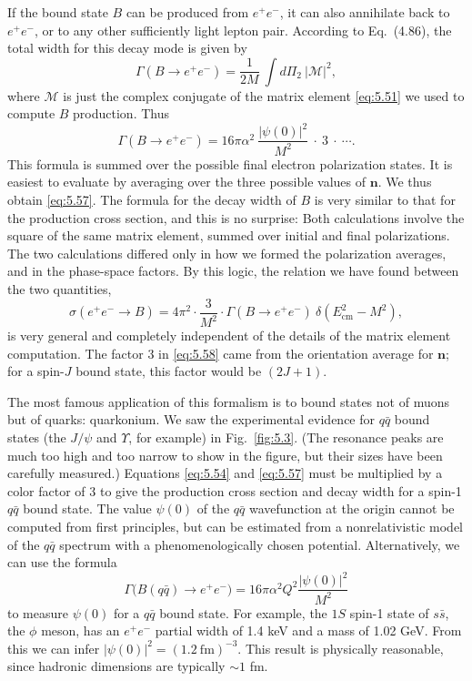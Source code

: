 If the bound state $B$ can be produced from $e^{+}e^{-}$, it can also annihilate
back to $e^{+}e^{-}$, or to any other sufficiently light lepton pair.
According to Eq.~(4.86), the total width for this decay mode is given by
\begin{equation}
  \Gamma(B \to e^{+}e^{-}) = \frac{1}{2M}\ \int d\Pi_2\ |\mathcal{M}|^2 ,
  \label{eq:5.55}
\end{equation}
where $\mathcal{M}$ is just the complex conjugate of the matrix element
\eqref{eq:5.51} we used to compute $B$ production.  Thus
\begin{equation}
  \Gamma(B \to e^{+}e^{-}) = 16\pi\alpha^2\ \frac{|\psi(0)|^2}{M^2}\
    \cdot\ 3\ \cdot\ \cdots .
  \label{eq:5.57}
\end{equation}
This formula is summed over the possible final electron polarization states.
It is easiest to evaluate by averaging over the three possible values of
$\mathbf{n}$.  We thus obtain \eqref{eq:5.57}.  The formula for the decay
width of $B$ is very similar to that for the production cross section, and
this is no surprise: Both calculations involve the square of the same matrix
element, summed over initial and final polarizations.  The two calculations
differed only in how we formed the polarization averages, and in the
phase-space factors.  By this logic, the relation we have found between the
two quantities,
\begin{equation}
  \sigma(e^{+}e^{-}\to B) = 4\pi^2\cdot\frac{3}{M^2}\cdot
    \Gamma(B\to e^{+}e^{-})\ \delta(E^2_{\mathrm{cm}} - M^2),
  \label{eq:5.58}
\end{equation}
is very general and completely independent of the details of the matrix
element computation.  The factor 3 in \eqref{eq:5.58} came from the
orientation average for $\mathbf{n}$; for a spin-$J$ bound state, this factor
would be $(2J+1)$.

The most famous application of this formalism is to bound states not of muons
but of quarks: quarkonium.  We saw the experimental evidence for $q\bar{q}$
bound states (the $J/\psi$ and $\Upsilon$, for example) in Fig.~\ref{fig:5.3}.
(The resonance peaks are much too high and too narrow to show in the figure,
but their sizes have been carefully measured.)  Equations \eqref{eq:5.54} and
\eqref{eq:5.57} must be multiplied by a color factor of 3 to give the
production cross section and decay width for a spin-1 $q\bar{q}$ bound state.
The value $\psi(0)$ of the $q\bar{q}$ wavefunction at the origin cannot be
computed from first principles, but can be estimated from a nonrelativistic
model of the $q\bar{q}$ spectrum with a phenomenologically chosen potential.
Alternatively, we can use the formula
\begin{equation}
  \Gamma\bigl( B(q\bar{q}) \to e^{+}e^{-} \bigr) = 16\pi\alpha^2 Q^2
    \frac{|\psi(0)|^2}{M^2}
  \label{eq:5.59}
\end{equation}
to measure $\psi(0)$ for a $q\bar{q}$ bound state.  For example, the $1S$
spin-1 state of $s\bar{s}$, the $\phi$ meson, has an $e^{+}e^{-}$ partial width
of 1.4 keV and a mass of 1.02 GeV.  From this we can infer
$|\psi(0)|^2 = (1.2\ \mathrm{fm})^{-3}$.  This result is physically
reasonable, since hadronic dimensions are typically $\sim 1$ fm.

